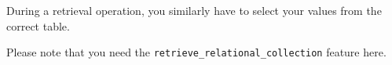 During a retrieval operation, you similarly have to select your values from the correct table.

Please note that you need the \lstinline!retrieve_relational_collection! feature here.







